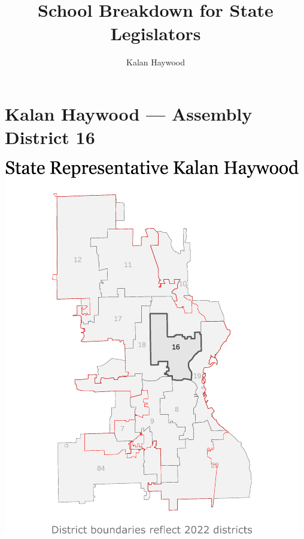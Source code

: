 \documentclass[
]{article}
\title{School Breakdown for State Legislators}
\subtitle{Kalan Haywood}
\author{}
\date{\vspace{-2.5em}}
\begin{document}
\maketitle

{
\setcounter{tocdepth}{3}
\tableofcontents
}
\newpage

\hypertarget{kalan-haywood-assembly-district-16}{%
\section{Kalan Haywood --- Assembly District
16}\label{kalan-haywood-assembly-district-16}}

\begin{center}\includegraphics{drake_latonya_assembly_files/figure-latex/unnamed-chunk-1-1} \end{center}

\vspace{1in}
\end{document}

